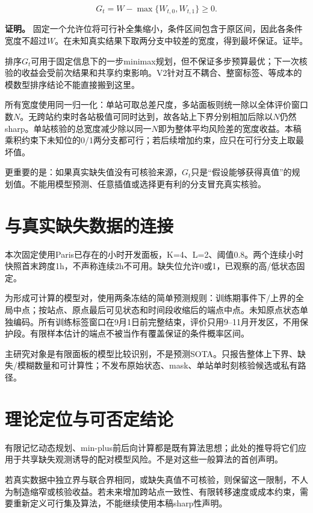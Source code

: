 \documentclass[UTF8,11pt,a4paper,fontset=windows]{ctexart}
\begin{document}
\begin{equation}
G_t=W-\max\{W_{t,0},W_{t,1}\}\ge0.\tag{P7}
\end{equation}

\textbf{证明。} 固定一个允许位将可行补全集缩小，条件区间包含于原区间，因此各条件宽度不超过$W$。在未知真实结果下取两分支中较差的宽度，得到最坏保证。证毕。


排序$G_t$可用于固定信息下的一步minimax规划，但不保证多步预算最优；下一次核验的收益会受前次结果和共享约束影响。V2针对互不耦合、整窗标签、等成本的模数型排序结论不能直接搬到这里。


所有宽度使用同一归一化：单站可取总差尺度，多站面板则统一除以全体评价窗口数$N$。无跨站约束时各站极值可同时达到，故各站上下界分别相加后除以$N$仍然sharp。单站核验的总宽度减少除以同一$N$即为整体平均风险差的宽度收益。本稿乘积约束下未知位的0/1两分支都可行；若后续增加约束，应只在可行分支上取最坏值。


更重要的是：如果真实缺失值没有可核验来源，$G_t$只是“假设能够获得真值”的规划值。不能用模型预测、任意插值或选择更有利的分支冒充真实核验。


\section{与真实缺失数据的连接}

本次固定使用Paris已存在的小时开发面板，K=4、L=2、阈值0.8。两个连续小时快照首末跨度1h，不声称连续2h不可用。缺失位允许0或1，已观察的高/低状态固定。


为形成可计算的模型对，使用两条冻结的简单预测规则：训练期事件下/上界的全局中点；按站点、原点最后可见状态和时间段收缩后的端点中点。未知原点状态单独编码。所有训练标签窗口在9月1日前完整结束，评价只用9--11月开发区，不用保护段。有限样本估计的端点不被当作有覆盖保证的条件概率区间。


主研究对象是有限面板的模型比较识别，不是预测SOTA。只报告整体上下界、缺失/模糊数量和可计算性；不发布原始状态、mask、单站单时刻核验候选或私有路径。


\section{理论定位与可否定结论}

有限记忆动态规划、min-plus前后向计算都是既有算法思想；此处的推导将它们应用于共享缺失观测诱导的配对模型风险。不是对这些一般算法的首创声明。


若真实数据中独立界与联合界相同，或缺失真值不可核验，则保留这一限制，不人为制造缩窄或核验收益。若未来增加跨站点一致性、有限转移速度或成本约束，需要重新定义可行集及算法，不能继续使用本稿sharp性声明。
\end{document}
